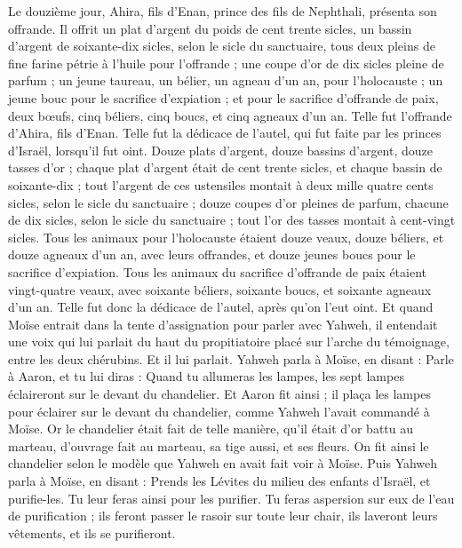 \begin{multicols}{2}
Le douzième jour, Ahira, fils d'Enan, prince des fils de Nephthali, présenta son offrande.
Il offrit un plat d'argent du poids de cent trente sicles, un bassin d'argent de soixante-dix sicles, selon le sicle du sanctuaire, tous deux pleins de fine farine pétrie à l'huile pour l'offrande ;
une coupe d'or de dix sicles pleine de parfum ;
un jeune taureau, un bélier, un agneau d'un an, pour l'holocauste ;
un jeune bouc pour le sacrifice d'expiation ;
et pour le sacrifice d'offrande de paix, deux bœufs, cinq béliers, cinq boucs, et cinq agneaux d'un an. Telle fut l'offrande d'Ahira, fils d'Enan.
Telle fut la dédicace de l'autel, qui fut faite par les princes d'Israël, lorsqu'il fut oint. Douze plats d'argent, douze bassins d'argent, douze tasses d'or ;
chaque plat d'argent était de cent trente sicles, et chaque bassin de soixante-dix ; tout l'argent de ces ustensiles montait à deux mille quatre cents sicles, selon le sicle du sanctuaire ;
douze coupes d'or pleines de parfum, chacune de dix sicles, selon le sicle du sanctuaire ; tout l'or des tasses montait à cent-vingt sicles.
Tous les animaux pour l'holocauste étaient douze veaux, douze béliers, et douze agneaux d'un an, avec leurs offrandes, et douze jeunes boucs pour le sacrifice d'expiation.
Tous les animaux du sacrifice d'offrande de paix étaient vingt-quatre veaux, avec soixante béliers, soixante boucs, et soixante agneaux d'un an. Telle fut donc la dédicace de l'autel, après qu'on l'eut oint.
Et quand Moïse entrait dans la tente d'assignation pour parler avec Yahweh, il entendait une voix qui lui parlait du haut du propitiatoire placé sur l'arche du témoignage, entre les deux chérubins. Et il lui parlait.
\VerseOne{}Yahweh parla à Moïse, en disant :
Parle à Aaron, et tu lui diras : Quand tu allumeras les lampes, les sept lampes éclaireront sur le devant du chandelier.
Et Aaron fit ainsi ; il plaça les lampes pour éclairer sur le devant du chandelier, comme Yahweh l'avait commandé à Moïse.
Or le chandelier était fait de telle manière, qu'il était d'or battu au marteau, d'ouvrage fait au marteau, sa tige aussi, et ses fleurs. On fit ainsi le chandelier selon le modèle que Yahweh en avait fait voir à Moïse.
Puis Yahweh parla à Moïse, en disant :
Prends les Lévites du milieu des enfants d'Israël, et purifie-les.
Tu leur feras ainsi pour les purifier. Tu feras aspersion sur eux de l'eau de purification ; ils feront passer le rasoir sur toute leur chair, ils laveront leurs vêtements, et ils se purifieront.

\end{multicols}
